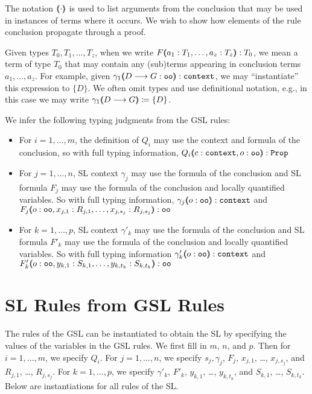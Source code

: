 The notation $(\hspace{-0.35em} \langle \cdot \rangle \hspace{-0.35em})$ is used to list arguments from the conclusion that may be used in instances of terms where it occurs. We wish to show how elements of the rule conclusion propagate through a proof.

Given types $T_0, T_1 , \ldots , T_z$, when we write $F (\hspace{-0.35em} \langle a_1 : T_1 , \ldots , a_z : T_z \rangle \hspace{-0.35em}) : T_0$, we mean a term of type $T_0$ that may contain any (sub)terms appearing in conclusion terms $a_1, \ldots , a_z$. For example, given $\gamma_1 (\hspace{-0.35em} \langle D \longrightarrow G : \texttt{oo} \rangle \hspace{-0.35em}) : \texttt{context}$, we may ``instantiate'' this expression to $\{ D \}$. We often omit types and use definitional notation, e.g., in this case we may write $\gamma_1 (\hspace{-0.35em} \langle D \longrightarrow G \rangle \hspace{-0.35em}) \coloneqq \{ D \}$.

We infer the following typing judgments from the GSL rules:
\begin{itemize}
 \item For $i = 1 ,\ldots , m$, the definition of $Q_i$ may use the context and formula of the conclusion, so with full typing information, $Q_i (\hspace{-0.35em} \langle c : \texttt{context} , o : \texttt{oo} \rangle \hspace{-0.35em}) : \texttt{Prop}$
 \item For $j = 1 , \ldots , n$, SL context $\gamma_j$ may use the formula of the conclusion and SL formula $F_j$ may use the formula of the conclusion and locally quantified variables. So with full typing information, $\gamma_j (\hspace{-0.35em} \langle o : \texttt{oo} \rangle \hspace{-0.35em}) : \texttt{context}$ and $F_j (\hspace{-0.35em} \langle o : \texttt{oo} , x_{j,1} : R_{j,1} , \ldots , x_{j,s_j} : R_{j,s_j} \rangle \hspace{-0.35em}) : \texttt{oo}$
 \item For $k = 1 , \ldots , p$, SL context $\gamma'_k$ may use the formula of the conclusion and SL formula $F'_k$ may use the formula of the conclusion and locally quantified variables. So with full typing information $\gamma'_k (\hspace{-0.35em} \langle o : \texttt{oo} \rangle \hspace{-0.35em}) : \texttt{context}$ and $F'_k (\hspace{-0.35em} \langle o : \texttt{oo} , y_{k,1} : S_{k,1} , \ldots , y_{k,t_k} : S_{k,t_k} \rangle \hspace{-0.35em}) : \texttt{oo}$
\end{itemize}



\section{SL Rules from GSL Rules}
\label{sec:sltogsl}

The rules of the GSL can be instantiated to obtain the SL by specifying the values of the variables in the GSL rules. We first fill in $m$, $n$, and $p$.  Then for $i = 1 , \ldots , m$, we specify $Q_i$.  For $j = 1 , \ldots , n$, we specify $s_j, \gamma_j$, $F_j$, $x_{j,1}$, \dots , $x_{j,s_j}$, and $R_{j,1}$, \dots , $R_{j,s_j}$. For $k = 1 , \ldots , p$, we specify $\gamma'_k$, $F'_k$, $y_{k,1}$, \dots , $y_{k,t_k}$, and $S_{k,1}$, \dots , $S_{k,t_k}$. Below are instantiations for all rules of the SL.

